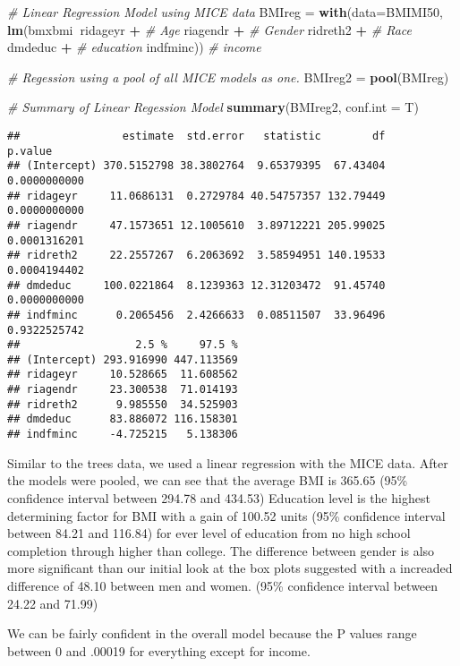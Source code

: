 \documentclass[]{article}
\newenvironment{Shaded}{\begin{snugshade}}{\end{snugshade}}
\newcommand{\KeywordTok}[1]{\textcolor[rgb]{0.13,0.29,0.53}{\textbf{#1}}}
\newcommand{\DataTypeTok}[1]{\textcolor[rgb]{0.13,0.29,0.53}{#1}}
\newcommand{\StringTok}[1]{\textcolor[rgb]{0.31,0.60,0.02}{#1}}
\newcommand{\CommentTok}[1]{\textcolor[rgb]{0.56,0.35,0.01}{\textit{#1}}}
\newcommand{\OperatorTok}[1]{\textcolor[rgb]{0.81,0.36,0.00}{\textbf{#1}}}
\newcommand{\NormalTok}[1]{#1}
\begin{document}
\begin{Shaded}
\begin{Highlighting}[]
\CommentTok{# Linear Regression Model using MICE data}
\NormalTok{BMIreg =}\StringTok{ }\KeywordTok{with}\NormalTok{(}\DataTypeTok{data=}\NormalTok{BMIMI50, }\KeywordTok{lm}\NormalTok{(bmxbmi}\OperatorTok{~}\NormalTok{ridageyr }\OperatorTok{+}\StringTok{    }\CommentTok{# Age}
\StringTok{                                 }\NormalTok{riagendr }\OperatorTok{+}\StringTok{         }\CommentTok{# Gender}
\StringTok{                                 }\NormalTok{ridreth2 }\OperatorTok{+}\StringTok{         }\CommentTok{# Race}
\StringTok{                                 }\NormalTok{dmdeduc }\OperatorTok{+}\StringTok{          }\CommentTok{# education}
\StringTok{                                 }\NormalTok{indfminc))         }\CommentTok{# income}

\CommentTok{# Regession using a pool of all MICE models as one.}
\NormalTok{BMIreg2 =}\StringTok{ }\KeywordTok{pool}\NormalTok{(BMIreg)}

\CommentTok{# Summary of Linear Regession Model }
\KeywordTok{summary}\NormalTok{(BMIreg2, }\DataTypeTok{conf.int =}\NormalTok{ T)}
\end{Highlighting}
\end{Shaded}

\begin{verbatim}
##                estimate  std.error   statistic        df      p.value
## (Intercept) 370.5152798 38.3802764  9.65379395  67.43404 0.0000000000
## ridageyr     11.0686131  0.2729784 40.54757357 132.79449 0.0000000000
## riagendr     47.1573651 12.1005610  3.89712221 205.99025 0.0001316201
## ridreth2     22.2557267  6.2063692  3.58594951 140.19533 0.0004194402
## dmdeduc     100.0221864  8.1239363 12.31203472  91.45740 0.0000000000
## indfminc      0.2065456  2.4266633  0.08511507  33.96496 0.9322525742
##                  2.5 %     97.5 %
## (Intercept) 293.916990 447.113569
## ridageyr     10.528665  11.608562
## riagendr     23.300538  71.014193
## ridreth2      9.985550  34.525903
## dmdeduc      83.886072 116.158301
## indfminc     -4.725215   5.138306
\end{verbatim}

Similar to the trees data, we used a linear regression with the MICE
data. After the models were pooled, we can see that the average BMI is
365.65 (95\% confidence interval between 294.78 and 434.53) Education
level is the highest determining factor for BMI with a gain of 100.52
units (95\% confidence interval between 84.21 and 116.84) for ever level
of education from no high school completion through higher than college.
The difference between gender is also more significant than our initial
look at the box plots suggested with a increaded difference of 48.10
between men and women. (95\% confidence interval between 24.22 and
71.99)

We can be fairly confident in the overall model because the P values
range between 0 and .00019 for everything except for income.
\end{document}
